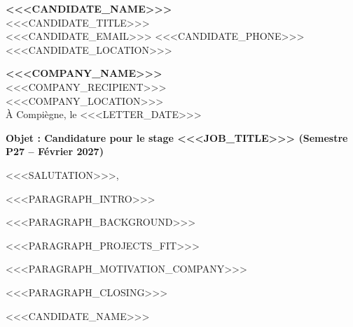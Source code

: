\documentclass[11pt]{article}
\begin{document}
\textbf{<<<CANDIDATE_NAME>>>} \\
<<<CANDIDATE_TITLE>>> \\
<<<CANDIDATE_EMAIL>>> \enspace\textbar\enspace <<<CANDIDATE_PHONE>>> \\
<<<CANDIDATE_LOCATION>>>

\vspace{12pt}

\begin{flushright}
    \textbf{<<<COMPANY_NAME>>>} \\
    <<<COMPANY_RECIPIENT>>> \\
    <<<COMPANY_LOCATION>>> \\
    \vspace{6pt}
    À Compiègne, le <<<LETTER_DATE>>>
\end{flushright}

\vspace{10pt}

\textbf{Objet : Candidature pour le stage <<<JOB_TITLE>>> (Semestre P27 -- Février 2027)}

\vspace{10pt}

<<<SALUTATION>>>,

<<<PARAGRAPH_INTRO>>>

<<<PARAGRAPH_BACKGROUND>>>

<<<PARAGRAPH_PROJECTS_FIT>>>

<<<PARAGRAPH_MOTIVATION_COMPANY>>>

<<<PARAGRAPH_CLOSING>>>

\vspace{14pt}

\begin{flushright}
    <<<CANDIDATE_NAME>>>
\end{flushright}
\end{document}
